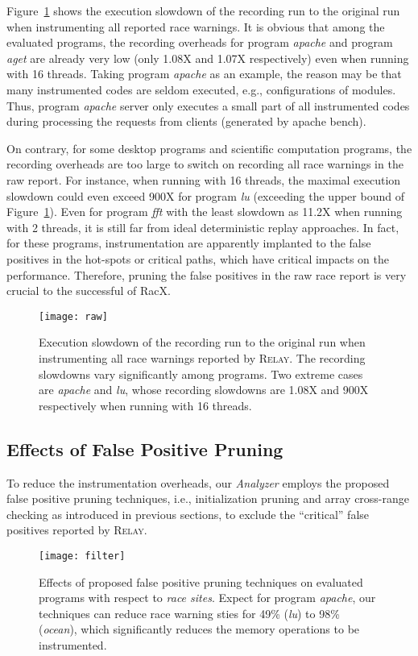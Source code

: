 \documentclass[10pt,onecolumn,letterpaper]{article}
\begin{document}
Figure~\ref{fig:raw} shows the execution slowdown of the recording
run to the original run when instrumenting all reported race
warnings. It is obvious that among the evaluated programs, the
recording overheads for program \emph{apache} and program
\emph{aget} are already very low (only 1.08X and 1.07X respectively)
even when running with 16 threads. Taking program \emph{apache} as
an example, the reason may be that many instrumented codes are
seldom executed, e.g., configurations of modules. Thus, program
\emph{apache} server only executes a small part of all instrumented
codes during processing the requests from clients (generated by
apache bench).

On contrary, for some desktop programs and scientific computation
programs, the recording overheads are too large to switch on
recording all race warnings in the raw report. For instance, when
running with 16 threads, the maximal execution slowdown could even
exceed 900X for program \emph{lu} (exceeding the upper bound of
Figure~\ref{fig:raw}). Even for program \emph{fft} with the least
slowdown as 11.2X when running with 2 threads, it is still far from
ideal deterministic replay approaches. In fact, for these programs,
instrumentation are apparently implanted to the false positives in
the hot-spots or critical paths, which have critical impacts on the
performance. Therefore, pruning the false positives in the raw race
report is very crucial to the successful of RacX.
\begin{figure}[htbg]
\centering
\texttt{[image: raw]}
\caption{Execution slowdown of the recording run to the original run
when instrumenting all race warnings reported by R\textsc{elay}. The
recording slowdowns vary significantly among programs. Two extreme
cases are \emph{apache} and \emph{lu}, whose recording slowdowns are
1.08X and 900X respectively when running with 16
threads.}\label{fig:raw}
\end{figure}

\subsection{Effects of False Positive Pruning}
To reduce the instrumentation overheads, our \emph{Analyzer} employs
the proposed false positive pruning techniques, i.e., initialization
pruning and array cross-range checking as introduced in previous
sections, to exclude the ``critical'' false positives reported by
R\textsc{elay}.

\begin{figure}[htbg]
\centering
\texttt{[image: filter]}
\caption{Effects of proposed false positive pruning techniques on
evaluated programs with respect to \emph{race sites}. Expect for
program \emph{apache}, our techniques can reduce race warning sties
for 49\% (\emph{lu}) to 98\% (\emph{ocean}), which significantly
reduces the memory operations to be instrumented.}\label{fig:filter}
\end{figure}
\end{document}
